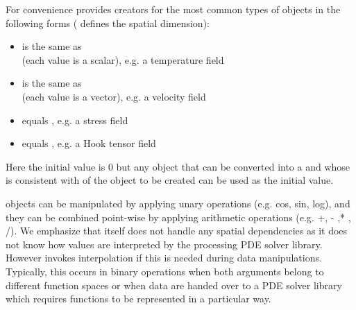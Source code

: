 For convenience \escript provides creators for the most common types
of \Data objects in the following forms ( defines the spatial dimension):
\begin{itemize}
\item {} is the same as \\
    (each value is a scalar), e.g. a temperature field
\item {} is the same as \\
    (each value is a vector), e.g. a velocity field
\item {} equals ,
    e.g. a stress field
\item {} equals ,
    e.g. a Hook tensor field
\end{itemize}
Here the initial value is 0 but any object that can be converted into
a \numpyNDA and whose \Shape is consistent with \Shape of the \Data object to
be created can be used as the initial value.

\Data objects can be manipulated by applying unary operations (e.g. cos, sin,
log), and they can be combined point-wise by applying arithmetic operations
(e.g. +, - ,* , /).
We emphasize that \escript itself does not handle any spatial dependencies as
it does not know how values are interpreted by the processing PDE solver library.
However \escript invokes interpolation if this is needed during data manipulations.
Typically, this occurs in binary operations when both arguments belong to
different function spaces or when data are handed over to a PDE solver library
which requires functions to be represented in a particular way.

